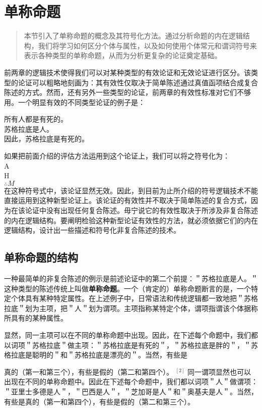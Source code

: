 \section{单称命题}

\begin{quotation}
本节引入了单称命题的概念及其符号化方法。通过分析命题的内在逻辑结构，我们将学习如何区分个体与属性，以及如何使用个体常元和谓词符号来表示各种类型的单称命题，从而为分析更复杂的论证奠定基础。
\end{quotation}

前两章的逻辑技术使得我们可以对某种类型的有效论证和无效论证进行区分。该类型的论证可以粗略地刻画为：其有效性仅取决于简单陈述通过真值函项结合成复合陈述的方式。然而，还有另外一些类型的论证，前两章的有效性标准对它们不够用。一个明显有效的不同类型论证的例子是：

所有人都是有死的。\\
苏格拉底是人。\\
因此，苏格拉底是有死的。

如果把前面介绍的评估方法运用到这个论证上，我们可以将之符号化为：\\
A\\
H\\
$\therefore M$\\
在这种符号式中，该论证显然无效。因此，到目前为止所介绍的符号逻辑技术不能直接运用到这种新型论证上。该论证的有效性并不取决于简单陈述的复合方式，因为在该论证中没有出现任何复合陈述。毋宁说它的有效性取决于所涉及非复合陈述的内在逻辑结构。要阐明检验这种新型论证有效性的方法，就必须依据它们的内在逻辑结构，设计出一些描述和符号化非复合陈述的技术。

\subsection{单称命题的结构}

一种最简单的非复合陈述的例示是前述论证中的第二个前提：＂苏格拉底是人。＂这种类型的陈述传统上叫做\textbf{单称命题}。一个（肯定的）单称命题断言的是，一个特定个体具有某种特定属性。在上述例子中，日常语法和传统逻辑都一致地把＂苏格拉底＂划为主项，把＂人＂划为谓项。主项指称某特定个体，谓项指谓该个体据称所具有的某种属性。

显然，同一主项可以在不同的单称命题中出现。因此，在下述每个命题中，我们都以词项＂苏格拉底＂做主项：＂苏格拉底是有死的＂，＂苏格拉底是胖的＂，＂苏格拉底是聪明的＂和＂苏格拉底是漂亮的＂。当然，有些是

真的（第一和第三个），有些是假的（第二和第四个）。 ${ }^{[2]}$ 同一谓项显然也可以出现在不同的单称命题中。因此在下述每个命题中，我们都以词项＂人＂做谓项：＂亚里士多德是人＂，＂巴西是人＂，＂芝加哥是人＂和＂奥基夫是人＂。当然，有些是真的（第一和第四个），有些是假的（第二和第三个）。

